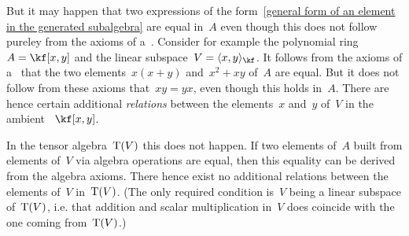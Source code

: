 \begin{recall}
\begin{description}
\begin{description}
					But it may happen that two expressions of the form~\eqref{general form of an element in the generated subalgebra} are equal in~$A$ even though this does not follow pureley from the axioms of a~\algebra{$\kf$}.
					Consider for example the polynomial ring~$A = \kf[x, y]$ and the linear subspace~$V = \gen{x, y}_{\kf}$.
					It follows from the axioms of a~\algebra{$\kf$} that the two elements~$x (x+y)$ and~$x^2 + xy$ of~$A$ are equal.
					But it does not follow from these axioms that~$xy = yx$, even though this holds in~$A$.
					There are hence certain additional \emph{relations} between the elements~$x$ and~$y$ of~$V$ in the ambient \algebra{$\kf$}~$\kf[x,y]$.
					
					In the tensor algebra~$\operatorname{T}(V)$ this does not happen.
					If two elements of~$A$ built from elements of~$V$ via algebra operations are equal, then this equality can be derived from the algebra axioms.
					There hence exist no additional relations between the elements of~$V$ in~$\operatorname{T}(V)$.
					(The only required condition is~$V$ being a linear subspace of~$\operatorname{T}(V)$, i.e. that addition and scalar multiplication in~$V$ does coincide with the one coming from~$\operatorname{T}(V)$.)
					

\end{description}
\end{description}
\end{recall}
